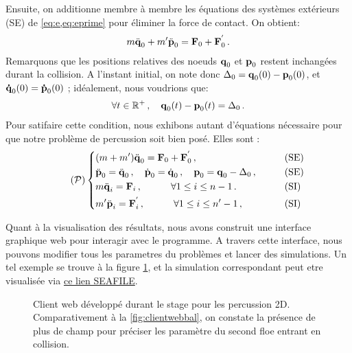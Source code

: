 \noindent Ensuite, on additionne membre à membre les équations des systèmes extérieurs (SE) de \cref{eq:e,eq:eprime} pour éliminer la force de contact. On obtient:
\begin{align}
m \ddot{\bm{\mathrm{q}}}_0 + m' \ddot{\bm{\mathrm{p}}}_0 = \bm{\mathrm{F}}_0 + \bm{\mathrm{F}}^{'}_0 \,.
\end{align}
Remarquons que les positions relatives des noeuds $\bm{\mathrm{q}}_0$ et $\bm{\mathrm{p}}_0$ restent inchangées durant la collision. A l'instant initial, on note donc $\Delta_0 = \bm{\mathrm{q}}_0(0) - \bm{\mathrm{p}}_0(0)$, et $\bm{\mathrm{\dot q}}_0(0) = \bm{\mathrm{\dot p}}_0(0)$ ; idéalement, nous voudrions que:
\begin{align}
\forall t \in \mathbb{R}^+ \,, \quad \bm{\mathrm{q}}_0(t) - \bm{\mathrm{p}}_0(t) = \Delta_0\,.
\end{align}
Pour satifaire cette condition, nous exhibons autant d'équations nécessaire pour que notre problème de percussion soit bien posé. Elles sont :
\begin{align} \tag{$\mathcal{P}$} \label{eq:problemeP}
\begin{dcases}
    (m+m') \ddot{\bvec{q}}_0  = \bvec{F}_0 + \bvec{F}^{'}_0  \,, &\qquad \text{(SE)} \\
    \ddot{\bvec{p}}_0 = \ddot{\bvec{q}}_0 \,, \quad \dot{\bvec{p}}_0 = \dot{\bvec{q}}_0 \,, \quad \bvec{p}_0 = \bvec{q}_0 - \Delta_0 \,, &\qquad \text{(SE)} \\
    m \ddot{\bvec{q}}_i = \bvec{F}_i   \,, \quad \quad \quad \forall 1 \leq i \leq n-1 \,. &\qquad \text{(SI)} \\
    m' \ddot{\bvec{p}}_i = \bvec{F}^{'}_i   \,, \quad \quad \quad \forall 1 \leq i \leq n'-1 \,, &\qquad \text{(SI)}
\end{dcases}
\end{align}

Quant à la visualisation des résultats, nous avons construit une interface graphique web pour interagir avec le programme. A travers cette interface, nous pouvons modifier tous les parametres du problèmes et lancer des simulations. Un tel exemple se trouve à la figure \cref{fig:clientwebmoi}, et la simulation correspondant peut etre visualisée via \href{ww}{ce lien SEAFILE}. 
\begin{figure}[!h]
    \centering
    \caption{Client web développé durant le stage pour les percussion 2D. Comparativement à la \cref{fig:clientwebbal}, on constate la présence de plus de champ pour préciser les paramètre du second floe entrant en collision.}
    \label{fig:clientwebmoi}
\end{figure}




